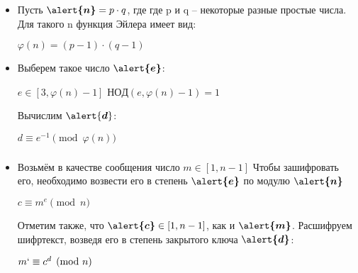 \documentclass[t]{beamer}
\begin{document}
\begin{frame}
	\frametitle{\insertsection}
	\framesubtitle{\insertsubsection}
    \begin{itemize}
        \item<1-> 
            Пусть $ \boldsymbol{\alert{n}} = p \cdot q $, где где p и q – некоторые разные простые числа. Для такого n функция Эйлера имеет вид: \newline 
            \begin{center} $\varphi(n) = (p - 1) \cdot (q - 1)$ \end{center}
            \vspace{3mm}
        \item<2-> 
            Выберем такое число $\boldsymbol{\alert{e}}$: \newline 
            \begin{center}
               \hspace{10mm} $ e \in [3, \varphi(n) - 1]$ \newline 
                $НОД(e, \varphi(n) - 1) = 1$
            \end{center}
            Вычислим $\alert{\boldsymbol{d}}$:  \newline 
            \begin{center}
                \( d\equiv e^{-1} \pmod{\varphi(n)} \)
            \end{center}
    \end{itemize}
\end{frame}

\begin{frame}
    \frametitle{\insertsection}
	\framesubtitle{\insertsubsection}
	\begin{itemize}
	    \item<1-> Возьмём в качестве сообщения число $m \in [1, n-1]$ \newline 
	    Чтобы зашифровать его, необходимо возвести \newline его в степень $\boldsymbol{\alert{e}}$ по модулю $\boldsymbol{\alert{n}}$ \newline 
	    \begin{center}
	         \( c\equiv m^{e} \pmod{n} \)
	         \vspace{3mm}
	    \end{center}
	    Отметим также, что $\boldsymbol{\alert{c}} \in [1, n-1]$, как и $\boldsymbol{\alert{m}}$. Расшифруем шифртекст, возведя его в степень закрытого ключа $\boldsymbol{\alert{d}}$:
	    
	    \begin{center}
	    \vspace{3mm}
	        \( m` \equiv c^d \pmod{n} \)
	        \vspace{3mm}
	    \end{center}
	\end{itemize}
\end{frame}
\end{document}
